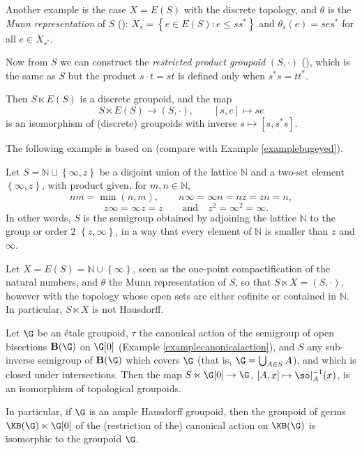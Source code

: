 \begin{example}
Another example is the case $X=E(S)$ with the discrete topology, and $\theta$ is the \emph{Munn representation} of $S$ (\cite{MR0262402}): $X_s=\left\{e\in E(S):e\leq ss^*\right\}$ and $\theta_s(e)=ses^*$ for all $e\in X_{s^*}$.

Now from $S$ we can construct the \emph{restricted product groupoid} $(S,\cdot)$ (\cite{MR1694900}), which is the same as $S$ but the product $s\cdot t=st$ is defined only when $s^*s=tt^*$.

Then $S\ltimes E(S)$ is a discrete groupoid, and the map
\[S\ltimes E(S)\to(S,\cdot),\qquad [s,e]\mapsto se\]
is an isomorphism of (discrete) groupoids with inverse $s\mapsto [s,s^*s]$.%
\end{example}

The following example is based on \cite[Example 5.18]{MR2565546} (compare with Example \ref{examplebugeyed}).

\begin{example}\label{nonhausdorffaction}
Let $S=\mathbb{N}\sqcup\left\{\infty,z\right\}$ be a disjoint union of the lattice $\mathbb{N}$ and a two-set element $\left\{\infty, z\right\}$, with product given, for $m,n\in\mathbb{N}$,
\[nm=\min(n,m),\qquad n\infty=\infty n=nz=zn=n,\]
\[\quad z\infty=\infty z=z\qquad\text{and}\quad z^2=\infty^2=\infty.\]
In other words, $S$ is the semigroup obtained by adjoining the lattice $\mathbb{N}$ to the group or order $2$ $\left\{z,\infty\right\}$, in a way that every element of $\mathbb{N}$ is smaller than $z$ and $\infty$.

Let $X=E(S)=\mathbb{N}\cup\left\{\infty\right\}$, seen as the one-point compactification of the natural numbers, and $\theta$ the Munn representation of $S$, so that $S\ltimes X=(S,\cdot)$, however with the topology whose open sets are either cofinite or contained in $\mathbb{N}$. In particular, $S \ltimes X$ is not Hausdorff.
\end{example}

\begin{example}[{\cite[Proposition 5.4]{MR2419901}}]\label{ex:amplegermesopenbisections}
Let $\G$ be an étale groupoid, $\tau$ the canonical action of the semigroup of open bisections $\operatorname{\mathbf{B}}(\G)$ on $\G[0]$ (Example \ref{examplecanonicalaction}), and $S$ any sub-inverse semigroup of $\operatorname{\mathbf{B}}(\G)$ which covers $\G$ (that is, $\G=\bigcup_{A\in S}A$), and which is closed under intersections.  Then the map $S\ltimes \G[0]\to\G$, $[A,x]\mapsto\so|_A^{-1}(x)$, is an isomorphism of topological groupoids.

In particular, if $\G$ is an ample Hausdorff groupoid, then the groupoid of germs $\KB(\G)\ltimes \G[0]$ of the (restriction of the) canonical action on $\KB(\G)$ is isomorphic to the groupoid $\G$.
\end{example}

